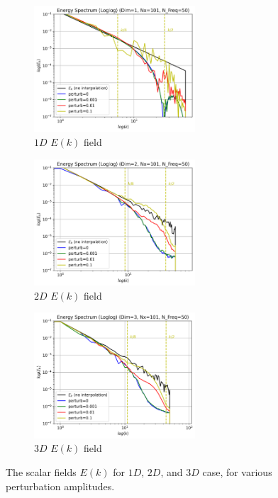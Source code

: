 \begin{figure}[htbp!]
    \begin{subfigure}{7cm}
      \centering\includegraphics[width=6cm]{Code-Figures/sin-vel-prof-pertub/Energy Spectrum (Loglog) (Dim=1, Nx=101, N_Freq=50).png}
      \caption{$1D$ $E(k)$ field}
    \end{subfigure}
    \begin{subfigure}{7cm}
      \centering\includegraphics[width=6cm]{Code-Figures/sin-vel-prof-pertub/Energy Spectrum (Loglog) (Dim=2, Nx=101, N_Freq=50).png}
      \caption{$2D$ $E(k)$ field}
    \end{subfigure}
    \begin{subfigure}{7cm}
        \centering\includegraphics[width=6cm]{Code-Figures/sin-vel-prof-pertub/Energy Spectrum (Loglog) (Dim=3, Nx=101, N_Freq=50).png}
        \caption{$3D$ $E(k)$ field}
      \end{subfigure}
    \caption{The scalar fields $E(k)$ for $1D$, $2D$, and $3D$ case, for various perturbation amplitudes.}
    \label{fig:espec-scalar-fields-per-ampl}
\end{figure}

